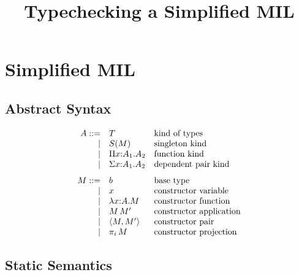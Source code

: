 \documentclass{article}
\title{Typechecking a Simplified MIL}
\theoremstyle{break}
\begin{document}
\maketitle

\section{Simplified MIL}

\subsection{Abstract Syntax}

\renewcommand{\ksingleton}[1]{S(#1)}
\renewcommand{\cfunction}[3]{\lambda #1{:}#2.#3}
\newcommand{\cpi}[2]{\capply{\pi_{#1}}{#2}}
\newcommand{\cpair}[2]{\langle{#1},{#2}\rangle}
\renewcommand{\kind}{A}
\newcommand{\otherkind}{B}
\renewcommand{\cvar}{x}
\newcommand{\othercvar}{y}
\renewcommand{\constructor}{M}
\newcommand{\otherconstructor}{N}
\renewcommand{\substitute}[2]{\{#1{\mapsto}#2\}}


\[
\begin{array}{rll}
\kind ::= &\ktype&\mbox{kind of types}\\
    |&\ksingleton{\constructor}&\mbox{singleton kind}\\
    |&\kpi{\cvar}{\kind_1}{\kind_2}&\mbox{function kind}\\
    |&\ksigma{\cvar}{\kind_1}{\kind_2}&\mbox{dependent pair kind}\\[7pt]

\constructor ::= &\basetype&\mbox{base type}\\
    |&\cvar&\mbox{constructor variable}\\
    |&\cfunction{\cvar}{\kind}{\constructor}
         &\mbox{constructor function}\\
    |&\capply{\constructor}{\constructor'}&\mbox{constructor application}\\
    |&\cpair{\constructor}{\constructor'}&\mbox{constructor pair}\\
    |&\cpi{i}{\constructor}&\mbox{constructor projection}\\
\end{array}
\]

\subsection{Static Semantics}

\end{document}
